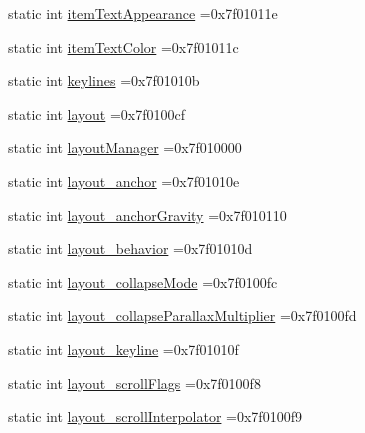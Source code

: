 \begin{DoxyCompactItemize}
\item 
static int \hyperlink{classandroid_1_1support_1_1v7_1_1recyclerview_1_1R_1_1attr_af7017004a16c94dc53fcdeef25d39cb5}{item\+Text\+Appearance} =0x7f01011e
\item 
static int \hyperlink{classandroid_1_1support_1_1v7_1_1recyclerview_1_1R_1_1attr_ab3fa3defb2d472a406e2028f986cafa3}{item\+Text\+Color} =0x7f01011c
\item 
static int \hyperlink{classandroid_1_1support_1_1v7_1_1recyclerview_1_1R_1_1attr_a9d53a7bf6fc45091cced26952145f745}{keylines} =0x7f01010b
\item 
static int \hyperlink{classandroid_1_1support_1_1v7_1_1recyclerview_1_1R_1_1attr_a4a8740f70c774b8ab6210012211a12df}{layout} =0x7f0100cf
\item 
static int \hyperlink{classandroid_1_1support_1_1v7_1_1recyclerview_1_1R_1_1attr_ac5ddc378bac8349ed65fdc8fc2dafff2}{layout\+Manager} =0x7f010000
\item 
static int \hyperlink{classandroid_1_1support_1_1v7_1_1recyclerview_1_1R_1_1attr_ab780d8172409e8afb8b7c9c5c8e09ea9}{layout\+\_\+anchor} =0x7f01010e
\item 
static int \hyperlink{classandroid_1_1support_1_1v7_1_1recyclerview_1_1R_1_1attr_add27f0446b44501fba5f52da1906b6af}{layout\+\_\+anchor\+Gravity} =0x7f010110
\item 
static int \hyperlink{classandroid_1_1support_1_1v7_1_1recyclerview_1_1R_1_1attr_af56be46f3648b3d53cd7f53d6223f955}{layout\+\_\+behavior} =0x7f01010d
\item 
static int \hyperlink{classandroid_1_1support_1_1v7_1_1recyclerview_1_1R_1_1attr_aab69032f9aa301bf80799ba24ddecf4b}{layout\+\_\+collapse\+Mode} =0x7f0100fc
\item 
static int \hyperlink{classandroid_1_1support_1_1v7_1_1recyclerview_1_1R_1_1attr_a0b7d67d7d834d8087b92a3764c28bab0}{layout\+\_\+collapse\+Parallax\+Multiplier} =0x7f0100fd
\item 
static int \hyperlink{classandroid_1_1support_1_1v7_1_1recyclerview_1_1R_1_1attr_a36e0bfc4ac29cf5dc73d154fe14a9c65}{layout\+\_\+keyline} =0x7f01010f
\item 
static int \hyperlink{classandroid_1_1support_1_1v7_1_1recyclerview_1_1R_1_1attr_a0d83cd5f5a760f225e9ef0ef75b56b7e}{layout\+\_\+scroll\+Flags} =0x7f0100f8
\item 
static int \hyperlink{classandroid_1_1support_1_1v7_1_1recyclerview_1_1R_1_1attr_a0fcbce82d76535909d5b875f09ac5678}{layout\+\_\+scroll\+Interpolator} =0x7f0100f9
\item 

\end{DoxyCompactItemize}

